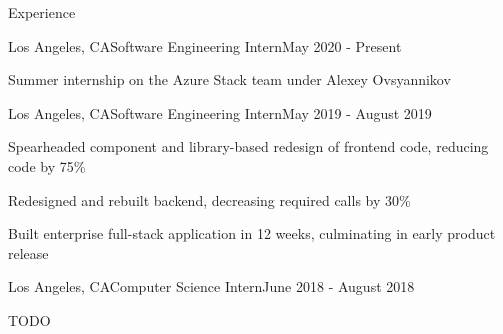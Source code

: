 \documentclass{resume} %
\begin{document}
\begin{rSection}{Experience}

\begin{rSubsection}{\microsoft}{Los Angeles, CA}{Software Engineering Intern}{May
    2020 - Present}
\item Summer internship on the Azure Stack team under Alexey Ovsyannikov
\end{rSubsection}


\begin{rSubsection}{\lefttravel}{Los Angeles, CA}{Software Engineering
    Intern}{May 2019 - August 2019}
\item Spearheaded component and library-based redesign of frontend code, 
    reducing code by 75\%
\item Redesigned and rebuilt backend, decreasing required calls by 30\%
\item Built enterprise full-stack application in 12 weeks, culminating in early
    product release
\end{rSubsection}


\begin{rSubsection}{\nymbl}{Los Angeles, CA}{Computer Science
    Intern}{June 2018 - August 2018}
\item TODO
\end{rSubsection}

\end{rSection}

\end{document}
